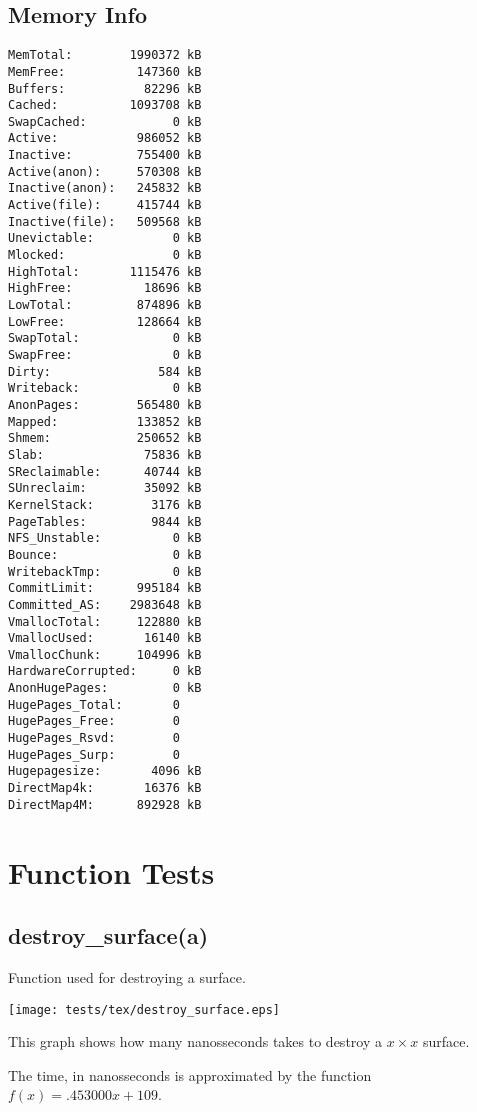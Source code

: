 \documentclass{article}
\begin{document}
\subsection{Memory Info}
\begin{verbatim}
MemTotal:        1990372 kB
MemFree:          147360 kB
Buffers:           82296 kB
Cached:          1093708 kB
SwapCached:            0 kB
Active:           986052 kB
Inactive:         755400 kB
Active(anon):     570308 kB
Inactive(anon):   245832 kB
Active(file):     415744 kB
Inactive(file):   509568 kB
Unevictable:           0 kB
Mlocked:               0 kB
HighTotal:       1115476 kB
HighFree:          18696 kB
LowTotal:         874896 kB
LowFree:          128664 kB
SwapTotal:             0 kB
SwapFree:              0 kB
Dirty:               584 kB
Writeback:             0 kB
AnonPages:        565480 kB
Mapped:           133852 kB
Shmem:            250652 kB
Slab:              75836 kB
SReclaimable:      40744 kB
SUnreclaim:        35092 kB
KernelStack:        3176 kB
PageTables:         9844 kB
NFS_Unstable:          0 kB
Bounce:                0 kB
WritebackTmp:          0 kB
CommitLimit:      995184 kB
Committed_AS:    2983648 kB
VmallocTotal:     122880 kB
VmallocUsed:       16140 kB
VmallocChunk:     104996 kB
HardwareCorrupted:     0 kB
AnonHugePages:         0 kB
HugePages_Total:       0
HugePages_Free:        0
HugePages_Rsvd:        0
HugePages_Surp:        0
Hugepagesize:       4096 kB
DirectMap4k:       16376 kB
DirectMap4M:      892928 kB
\end{verbatim}
\section{Function Tests}
\subsection{destroy\_surface(a)}
Function used for destroying a surface.

\texttt{[image: tests/tex/destroy\_surface.eps]}

This graph shows how many nanosseconds takes to destroy a $x \times x$ surface.

The time, in nanosseconds is 
approximated by the function $f(x)=.453000x+109$.
\end{document}
